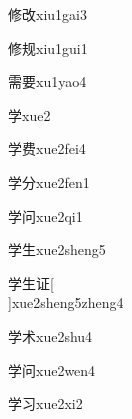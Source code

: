 \begin{verbete}[9;7]{修改}{xiu1gai3}
\end{verbete}

\begin{verbete}[9;8]{修规}{xiu1gui1}
\end{verbete}

\begin{verbete}[14;9]{需要}{xu1yao4}
\end{verbete}

\begin{verbete}[8]{学}{xue2}
\end{verbete}

\begin{verbete}[8;9]{学费}{xue2fei4}
\end{verbete}

\begin{verbete}[8;4]{学分}{xue2fen1}
\end{verbete}

\begin{verbete}[8;12]{学问}{xue2qi1}
\end{verbete}

\begin{verbete}[8;5]{学生}{xue2sheng5}
\end{verbete}

\begin{verbete}[8;5;7]{学生证}[\\]{xue2sheng5zheng4}
\end{verbete}

\begin{verbete}[8;5]{学术}{xue2shu4}
\end{verbete}

\begin{verbete}[8;6]{学问}{xue2wen4}
\end{verbete}

\begin{verbete}[8;3]{学习}{xue2xi2}
\end{verbete}

